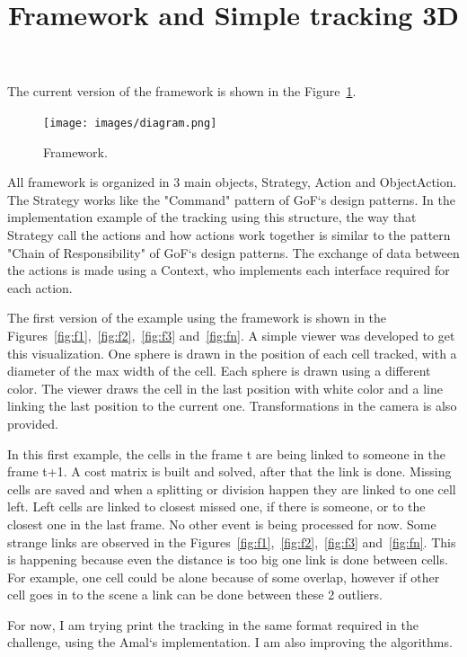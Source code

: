 \documentclass{article}
\title{Framework and Simple tracking 3D}
\begin{document}
\maketitle	

The current version of the framework is shown in the Figure~\ref{fig:diagram}.

\begin{figure}[!h]
	\centering
    \centerline{\texttt{[image: images/diagram.png]}}
    \caption{Framework.}
    \label{fig:diagram}
\end{figure}

All framework is organized in 3 main objects, Strategy, Action and ObjectAction. The Strategy works like the "Command" pattern of GoF`s design patterns. In the implementation example of the tracking using this structure, the way that Strategy call the actions and how actions work together is similar to the pattern "Chain of Responsibility" of GoF`s design patterns. The exchange of data between the actions is made using a Context, who implements each interface required for each action.

The first version of the example using the framework is shown in the Figures~\ref{fig:f1},~\ref{fig:f2},~\ref{fig:f3} and~\ref{fig:fn}. A simple viewer was developed to get this visualization. One sphere is drawn in the position of each cell tracked, with a diameter of the max width of the cell. Each sphere is drawn using a different color. The viewer draws the cell in the last position with white color and a line linking the last position to the current one. Transformations in the camera is also provided.

In this first example, the cells in the frame t are being linked to someone in the frame t+1. A cost matrix is built and solved, after that the link is done. Missing cells are saved and when a splitting or division happen they are linked to one cell left. Left cells are linked to closest missed one, if there is someone, or to the closest one in the last frame. No other event is being processed for now. Some strange links are observed in the Figures~\ref{fig:f1},~\ref{fig:f2},~\ref{fig:f3} and~\ref{fig:fn}. This is happening because even the distance is too big one link is done between cells. For example, one cell could be alone because of some overlap, however if other cell goes in to the scene a link can be done between these 2 outliers.

For now, I am trying print the tracking in the same format required in the challenge, using the Amal`s implementation. I am also improving the algorithms.
\end{document}
